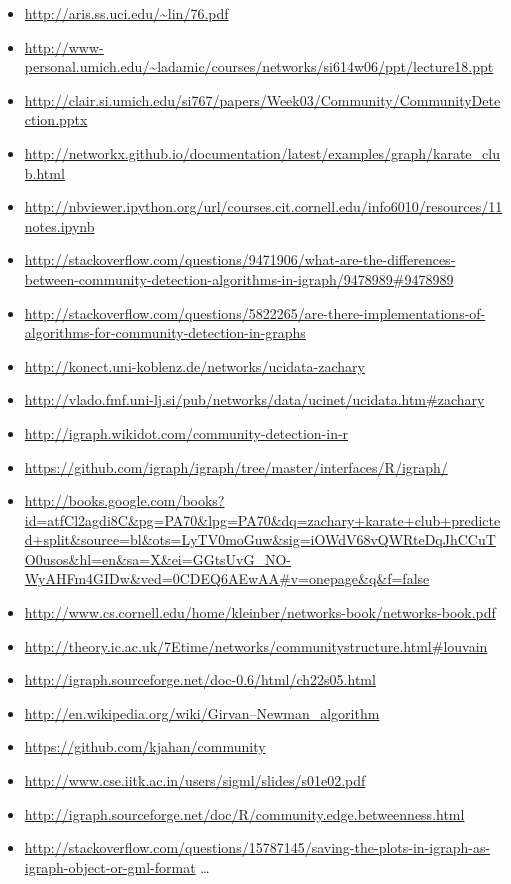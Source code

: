 \documentclass[letterpaper,11pt]{article}
\begin{document}
\begin{itemize}

\item \url{http://aris.ss.uci.edu/~lin/76.pdf}
\item \url{http://www-personal.umich.edu/~ladamic/courses/networks/si614w06/ppt/lecture18.ppt}
\item \url{http://clair.si.umich.edu/si767/papers/Week03/Community/CommunityDetection.pptx}
\item \url{http://networkx.github.io/documentation/latest/examples/graph/karate_club.html}
\item \url{http://nbviewer.ipython.org/url/courses.cit.cornell.edu/info6010/resources/11notes.ipynb}
\item \url{http://stackoverflow.com/questions/9471906/what-are-the-differences-between-community-detection-algorithms-in-igraph/9478989#9478989}
\item \url{http://stackoverflow.com/questions/5822265/are-there-implementations-of-algorithms-for-community-detection-in-graphs}
\item \url{http://konect.uni-koblenz.de/networks/ucidata-zachary}
\item \url{http://vlado.fmf.uni-lj.si/pub/networks/data/ucinet/ucidata.htm#zachary}
\item \url{http://igraph.wikidot.com/community-detection-in-r}
\item \url{https://github.com/igraph/igraph/tree/master/interfaces/R/igraph/}
\item \url{http://books.google.com/books?id=atfCl2agdi8C&pg=PA70&lpg=PA70&dq=zachary+karate+club+predicted+split&source=bl&ots=LyTV0moGuw&sig=iOWdV68vQWRteDqJhCCuTO0usos&hl=en&sa=X&ei=GGtsUvG_NO-WyAHFm4GIDw&ved=0CDEQ6AEwAA#v=onepage&q&f=false}
\item \url{http://www.cs.cornell.edu/home/kleinber/networks-book/networks-book.pdf}
\item \url{http://theory.ic.ac.uk/7Etime/networks/communitystructure.html#louvain}
\item \url{http://igraph.sourceforge.net/doc-0.6/html/ch22s05.html}
\item \url{http://en.wikipedia.org/wiki/Girvan–Newman_algorithm}
\item \url{https://github.com/kjahan/community}
\item \url{http://www.cse.iitk.ac.in/users/sigml/slides/s01e02.pdf}
\item \url{http://igraph.sourceforge.net/doc/R/community.edge.betweenness.html}
\item \url{http://stackoverflow.com/questions/15787145/saving-the-plots-in-igraph-as-igraph-object-or-gml-format}
\ldots
\end{itemize}
\end{document}
